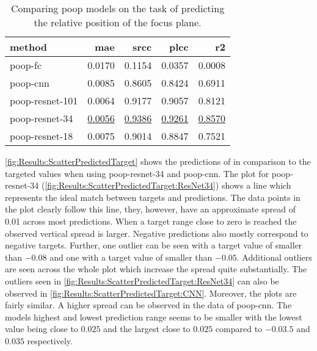 \begin{table}
    \centering
    \caption{Comparing \acs{poop} models on the task of predicting the relative position of the focus plane.}
    \begin{tabular}{lrrrr}
        \hline
        method          & \acs{mae} & \acs{srcc} & \acs{plcc} & \acs{r2} \\
        \hline
        \acs{poop}-\acs{fc}             & 0.0170 & 0.1154 & 0.0357 & 0.0008 \\
        \acs{poop}-\acs{cnn}            & 0.0085 & 0.8605 & 0.8424 & 0.6911 \\
        \acs{poop}-\acs{resnet}-101     & 0.0064 & 0.9177 & 0.9057 & 0.8121 \\
        \acs{poop}-\acs{resnet}-34      & \underline{0.0056} & \underline{0.9386} & \underline{0.9261} & \underline{0.8570} \\
        \acs{poop}-\acs{resnet}-18      & 0.0075 & 0.9014 & 0.8847 & 0.7521 \\
    \end{tabular}
    \label{tab:Results:Models:Accuracy}
\end{table}

\autoref{fig:Results:ScatterPredictedTarget} shows the predictions of in comparison to the targeted values when using \acs{poop}-\acs{resnet}-34 and \acs{poop}-\acs{cnn}. The plot for \acs{poop}-\acs{resnet}-34 (\autoref{fig:Results:ScatterPredictedTarget:ResNet34}) shows a line which represents the ideal match between targets and predictions. The data points in the plot clearly follow this line, they, however, have an approximate spread of 0.01 across most predictions. When a target range close to zero is reached the observed vertical spread is larger. Negative predictions also mostly correspond to negative targets. Further, one outlier can be seen with a target value of smaller than $-0.08$ and one with a target value of smaller than $-0.05$. Additional outliers are seen across the whole plot which increase the spread quite substantially. The outliers seen in \autoref{fig:Results:ScatterPredictedTarget:ResNet34} can also be observed in \autoref{fig:Results:ScatterPredictedTarget:CNN}. Moreover, the plots are fairly similar. A higher spread can be observed in the data of \acs{poop}-\acs{cnn}. The models highest and lowest prediction range seems to be smaller with the lowest value being close to $0.025$ and the largest close to $0.025$ compared to $-0.03.5$ and $0.035$ respectively.


